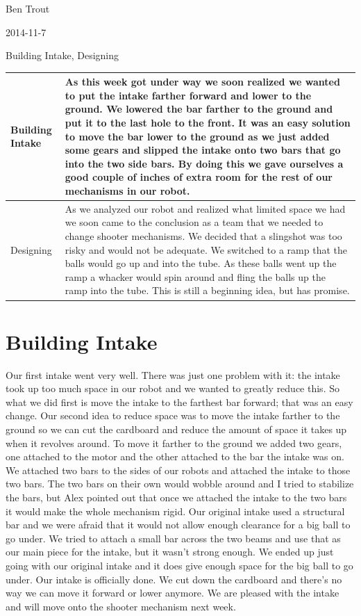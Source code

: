 Ben Trout

2014-11-7

Building Intake, Designing 

\begin{tabular}{|p{5cm}|p{5cm}|}
\hline
Building Intake&
As this week got under way we soon realized we wanted to put the intake farther forward and lower to the ground. We lowered the bar farther to the ground and put it to the last hole to the front. It was an easy solution to move the bar lower to the ground as we just added some gears and slipped the intake onto two bars that go into the two side bars. By doing this we gave ourselves a good couple of inches of extra room for the rest of our mechanisms in our robot. 
\\
\hline
Designing&
As we analyzed our robot and realized what limited space we had we soon came to the conclusion as a team that we needed to change shooter mechanisms. We decided that a slingshot was too risky and would not be adequate. We switched to a ramp that the balls would go up and into the tube. As these balls went up the ramp a whacker would spin around and fling the balls up the ramp into the tube. This is still a beginning idea, but has promise. %
\\
\hline
\end{tabular}

\section*{Building Intake}
Our first intake went very well. There was just one problem with it: the intake took up too much space in our robot and we wanted to greatly reduce this. So what we did first is move the intake to the farthest bar forward; that was an easy change. Our second idea to reduce space was to move the intake farther to the ground so we can cut the cardboard and reduce the amount of space it takes up when it revolves around. To move it farther to the ground we added two gears, one attached to the motor and the other attached to the bar the intake was on. We attached two bars to the sides of our robots and attached the intake to those two bars. The two bars on their own would wobble around and I tried to stabilize the bars, but Alex pointed out that once we attached the intake to the two bars it would make the whole mechanism rigid.  Our original intake used a structural bar and we were afraid that it would not allow enough clearance for a big ball to go under. We tried to attach a small bar across the two beams and use that as our main piece for the intake, but it wasn’t strong enough. We ended up just going with our original intake and it does give enough space for the big ball to go under. Our intake is officially done. We cut down the cardboard and there's no way we can move it forward or lower anymore. We are pleased with the intake and will move onto the shooter mechanism next week. 

